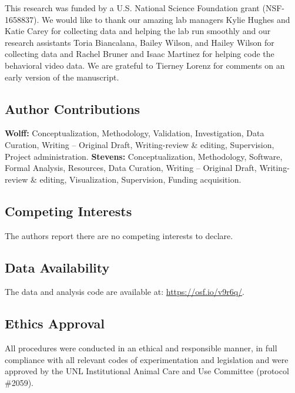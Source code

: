 \documentclass[
  pub]{apa6}
\begin{document}
This research was funded by a U.S. National Science Foundation grant (NSF-1658837). We would like to thank our amazing lab managers Kylie Hughes and Katie Carey for collecting data and helping the lab run smoothly and our research assistants Toria Biancalana, Bailey Wilson, and Hailey Wilson for collecting data and Rachel Bruner and Isaac Martinez for helping code the behavioral video data. We are grateful to Tierney Lorenz for comments on an early version of the manuscript.

\hypertarget{author-contributions}{%
\subsection{Author Contributions}\label{author-contributions}}

\textbf{Wolff:} Conceptualization, Methodology, Validation, Investigation, Data Curation, Writing -- Original Draft, Writing-review \& editing, Supervision, Project administration. \textbf{Stevens:} Conceptualization, Methodology, Software, Formal Analysis, Resources, Data Curation, Writing -- Original Draft, Writing-review \& editing, Visualization, Supervision, Funding acquisition.

\hypertarget{competing-interests}{%
\subsection{Competing Interests}\label{competing-interests}}

The authors report there are no competing interests to declare.

\hypertarget{data-availability}{%
\subsection{Data Availability}\label{data-availability}}

The data and analysis code are available at: \url{https://osf.io/v9r6q/}.

\hypertarget{ethics-approval}{%
\subsection{Ethics Approval}\label{ethics-approval}}

All procedures were conducted in an ethical and responsible manner, in full compliance with all relevant codes of experimentation and legislation and were approved by the UNL Institutional Animal Care and Use Committee (protocol \#2059).
\end{document}
